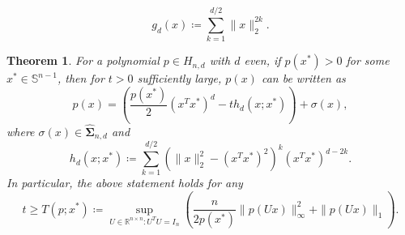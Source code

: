 \documentclass[10pt,a4paper]{amsart}
\newtheorem{theorem}{Theorem}
\newcommand{\HSOS}{\widehat{\mathbf{\Sigma}}}
\newcommand{\defeq}{\coloneq}
\newcommand{\mbS}{\mathbb{S}}
\newcommand{\reals}{\mathbb{R}}
\begin{document}
\begin{equation}
  g_d(x)\defeq\sum_{k=1}^{d/2}\|x\|_2^{2k}.  
\end{equation}

\begin{theorem}\label{thm:degd_homo}
For a polynomial $p\in H_{n,d}$ with $d$ even, if $p(x^*)>0$ for some $x^*\in \mbS^{n-1}$, then for $t>0$ sufficiently large, $p(x)$ can be written as
\begin{equation}\label{eq:degd_homo}
    p(x)=\left(\frac{p(x^*)}{2}(x^Tx^*)^d-th_d(x;x^*)\right)+\sigma(x),
\end{equation}
where $\sigma(x)\in\HSOS_{n,d}$ and 
\begin{equation}\label{eq:degd_homo_h}
h_d(x;x^*)\defeq\sum_{k=1}^{d/2}\left(\|x\|_2^2-(x^Tx^*)^2\right)^k(x^Tx^*)^{d-2k}.
\end{equation}
%
In particular, the above statement holds for any
\begin{equation}\label{eq:degd_homo_t}
t\ge T(p;x^*)\defeq\sup_{U\in\reals^{n\times n}:U^TU=I_n}\left( \frac{n}{2p(x^*)}\|p(Ux)\|_{\infty}^2 + \|p(Ux)\|_1\right).  
\end{equation}
\end{theorem}
\end{document}
